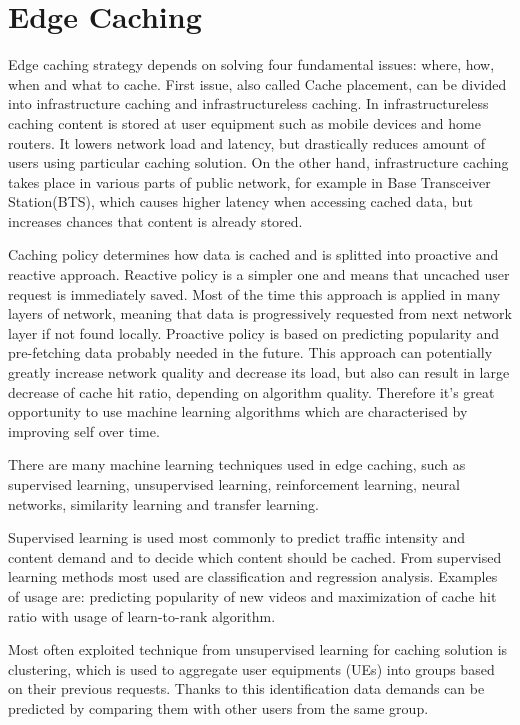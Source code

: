 \documentclass[conference]{IEEEtran}
\begin{document}
\section{Edge Caching}
Edge caching strategy depends on solving four fundamental issues: where, how, when and what to cache\cite{cache3}. First issue, also called Cache placement, can be divided into infrastructure caching and infrastructureless caching. In infrastructureless caching content is stored at user equipment such as mobile devices and home routers. It lowers network load and latency, but drastically reduces amount of users using particular caching solution. On the other hand, infrastructure caching takes place in various parts of public network, for example in Base Transceiver Station(BTS), which causes higher latency when accessing cached data, but increases chances that content is already stored\cite{cache3}. \par
Caching policy determines how data is cached and is splitted into proactive and reactive approach. Reactive policy is a simpler one and means that uncached user request is immediately saved. Most of the time this approach is applied in many layers of network, meaning that data is progressively requested from next network layer if not found locally. Proactive policy is based on predicting popularity and pre-fetching data probably needed in the future. This approach can potentially greatly increase network quality and decrease its load, but also can result in large decrease of cache hit ratio, depending on algorithm quality. Therefore it's great opportunity to use machine learning algorithms which are characterised by improving self over time\cite{cache3}. \par
There are many machine learning techniques used in edge caching, such as supervised learning, unsupervised learning, reinforcement learning, neural networks, similarity learning and transfer learning\cite{cache4}. \par
Supervised learning is used most commonly to predict traffic intensity and content demand and to decide which content should be cached. From supervised learning methods most used are classification and regression analysis\cite{cache1}. Examples of usage are: predicting popularity of new videos and maximization of cache hit ratio with usage of learn-to-rank algorithm\cite{cache3}. \par
Most often exploited technique from unsupervised learning for caching solution is clustering, which is used to aggregate user equipments (UEs) into groups based on their previous requests. Thanks to this identification data demands can be predicted by comparing them with other users from the same group\cite{cache1}. \par
\end{document}
